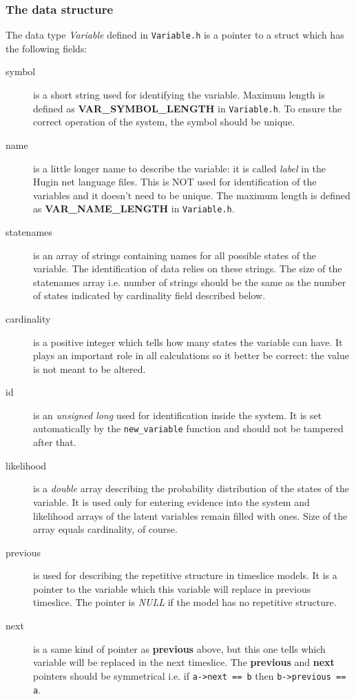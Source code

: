 \documentclass[12pt,a4paper]{report}
\newcommand{\cdatatype}[1]{{\it #1}}
\newcommand{\examplecode}[1]{\texttt{#1}}
\newcommand{\cfilename}[1]{\texttt{#1}}
\newcommand{\cdefine}[1]{\textbf{#1}}
\newcommand{\cstructfield}[1]{\textbf{#1}}
\newcommand{\cfunction}[1]{\texttt{#1}}
\begin{document}
\subsubsection{The data structure}
The data type \cdatatype{Variable} defined in \cfilename{Variable.h} 
is a pointer to a struct which has the following fields: 
\begin{description}
\item[symbol] is a short string used for identifying the variable. Maximum
length is defined as \cdefine{VAR\_SYMBOL\_LENGTH} in
\cfilename{Variable.h}. To ensure the correct operation of the system, the 
symbol should be unique.

\item[name] is a little longer name to describe the variable: it is
called {\it label} in the Hugin net language files. This is NOT used for 
identification of the variables and it doesn't need to be unique. 
The maximum length is defined as \cdefine{VAR\_NAME\_LENGTH} in 
\cfilename{Variable.h}.

\item[statenames] is an array of strings containing names for all
possible states of the variable. The identification of data relies on
these strings. The size of the statenames array i.e. number of
strings should be the same as the number of states indicated by
cardinality field described below.

\item[cardinality] is a positive integer which tells how many states
the variable can have. It plays an important role in all calculations
so it better be correct: the value is not meant to be altered.

\item[id] is an \cdatatype{unsigned long} used for identification
inside the system. It is set automatically by the \cfunction{new\_variable} 
function and should not be tampered after that.

\item[likelihood] is a \cdatatype{double} array describing the probability
distribution of the states of the variable. It is used only for
entering evidence into the system and likelihood arrays of the latent
variables remain filled with ones. Size of the array equals
cardinality, of course.

\item[previous] is used for describing the repetitive structure in
timeslice models. It is a pointer to the variable which this variable
will replace in previous timeslice. The pointer is \cdatatype{NULL} if 
the model has no repetitive structure.

\item[next] is a same kind of pointer as \cstructfield{previous} above, 
but this one tells which variable will be replaced in the next timeslice.
The \cstructfield{previous} and \cstructfield{next} pointers should be 
symmetrical i.e. if \examplecode{a->next == b} then 
\examplecode{b->previous == a}.
\end{description}
\end{document}

